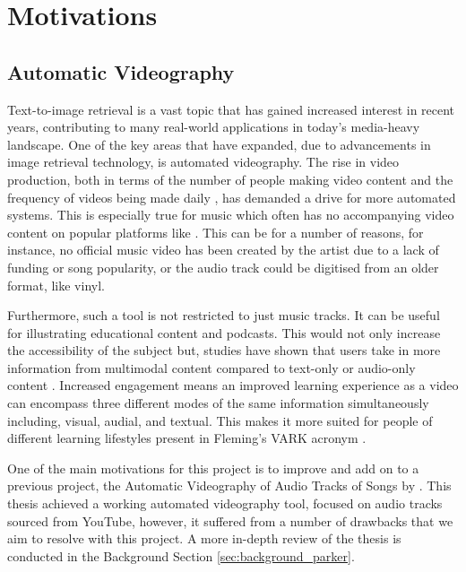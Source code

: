 \documentclass{l4proj}
\begin{document}
\section{Motivations}
\subsection{Automatic Videography}
Text-to-image retrieval is a vast topic that has gained increased interest in recent years, contributing to many real-world applications in today's media-heavy landscape. One of the key areas that have expanded, due to  advancements in image retrieval technology, is automated videography. The rise in video production, both in terms of the number of people making video content and the frequency of videos being made daily \citep{rise_video}, has demanded a drive for more automated systems. This is especially true for music which often has no accompanying video content on popular platforms like \cite{youtube}. This can be for a number of reasons, for instance, no official music video has been created by the artist due to a lack of funding or song popularity, or the audio track could be digitised from an older format, like vinyl. 

Furthermore, such a tool is not restricted to just music tracks. It can be useful for illustrating educational content and podcasts. This would not only increase the accessibility of the subject but, studies have shown that users take in more information from multimodal content compared to text-only or audio-only content \citep{benefits_of_mmv}. Increased engagement means an improved learning experience as a video can encompass three different modes of the same information simultaneously including, visual, audial, and textual. This makes it more suited for people of different learning lifestyles present in Fleming's VARK acronym \citep{vark}.

One of the main motivations for this project is to improve and add on to a previous project, the Automatic Videography of Audio Tracks of Songs by \cite{parker}. This thesis achieved a working automated videography tool, focused on audio tracks sourced from YouTube, however, it suffered from a number of drawbacks that we aim to resolve with this project. A more in-depth review of the thesis is conducted in the Background Section \ref{sec:background_parker}.
\end{document}
